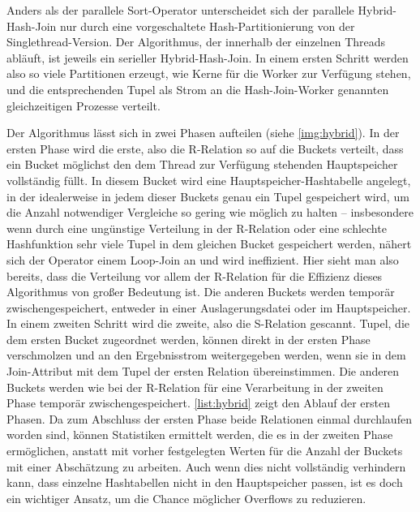 \documentclass[a4paper,12pt,twoside]{article}
\begin{document}
Anders als der parallele Sort-Operator unterscheidet sich der parallele Hybrid-Hash-Join nur durch eine vorgeschaltete Hash-Partitionierung von der Singlethread-Version. Der Algorithmus, der innerhalb der einzelnen Threads abläuft, ist jeweils ein serieller Hybrid-Hash-Join. In einem ersten Schritt werden also so viele Partitionen erzeugt, wie Kerne für die Worker zur Verfügung stehen, und die entsprechenden Tupel als Strom an die Hash-Join-Worker genannten gleichzeitigen Prozesse verteilt.

Der Algorithmus lässt sich in zwei Phasen aufteilen (siehe \autoref{img:hybrid}). In der ersten Phase wird die erste, also die R-Relation so auf die Buckets verteilt, dass ein Bucket möglichst den dem Thread zur Verfügung stehenden Hauptspeicher vollständig füllt. In diesem Bucket wird eine Hauptspeicher-Hashtabelle angelegt, in der idealerweise in jedem dieser Buckets genau ein Tupel gespeichert wird, um die Anzahl notwendiger Vergleiche so gering wie möglich zu halten -- insbesondere wenn durch eine ungünstige Verteilung in der R-Relation oder eine schlechte Hashfunktion sehr viele Tupel in dem gleichen Bucket gespeichert werden, nähert sich der Operator einem Loop-Join an und wird ineffizient. Hier sieht man also bereits, dass die Verteilung vor allem der R-Relation für die Effizienz dieses Algorithmus von großer Bedeutung ist. Die anderen Buckets werden temporär zwischengespeichert, entweder in einer Auslagerungsdatei oder im Hauptspeicher. In einem zweiten Schritt wird die zweite, also die S-Relation gescannt. Tupel, die dem ersten Bucket zugeordnet werden, können direkt in der ersten Phase verschmolzen und an den Ergebnisstrom weitergegeben werden, wenn sie in dem Join-Attribut mit dem Tupel der ersten Relation übereinstimmen. Die anderen Buckets werden wie bei der R-Relation für eine Verarbeitung in der zweiten Phase temporär zwischengespeichert. \autoref{list:hybrid} zeigt den Ablauf der ersten Phasen. Da zum Abschluss der ersten Phase beide Relationen einmal durchlaufen worden sind, können Statistiken ermittelt werden, die es in der zweiten Phase ermöglichen, anstatt mit vorher festgelegten Werten für die Anzahl der Buckets mit einer Abschätzung zu arbeiten. Auch wenn dies nicht vollständig verhindern kann, dass einzelne Hashtabellen nicht in den Hauptspeicher passen, ist es doch ein wichtiger Ansatz, um die Chance möglicher Overflows zu reduzieren.   
\end{document}
